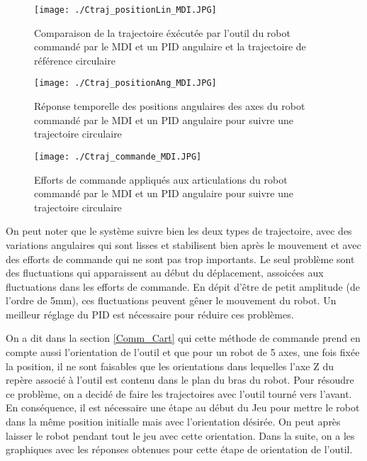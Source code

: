 \begin{figure}[H]
	\begin{center}	
		\captionsetup{justification=centering,margin=1cm}
		\texttt{[image: ./Ctraj\_positionLin\_MDI.JPG]}
		\caption{Comparaison de la trajectoire éxécutée par l'outil du robot commandé par le MDI et un PID angulaire et la trajectoire de référence circulaire}
		\label{fig:Ctraj_positionLin_MDI}
	\end{center}
\end{figure}
\newpage
\begin{figure}[H]
	\begin{center}	
		\captionsetup{justification=centering,margin=1cm}
		\texttt{[image: ./Ctraj\_positionAng\_MDI.JPG]}
		\caption{Réponse temporelle des positions angulaires des axes du robot commandé par le MDI et un PID angulaire pour suivre une trajectoire circulaire}
		\label{fig:Ctraj_positionAng_MDI}
	\end{center}
\end{figure}

\begin{figure}[H]
	\begin{center}	
		\captionsetup{justification=centering,margin=1cm}
		\texttt{[image: ./Ctraj\_commande\_MDI.JPG]}
		\caption{Efforts de commande appliqués aux articulations du robot commandé par le MDI et un PID angulaire pour suivre une trajectoire circulaire}
		\label{fig:Ctraj_commande_MDI}
	\end{center}
\end{figure}

On peut noter que le système suivre bien les deux types de trajectoire, avec des variations angulaires qui sont lisses et stabilisent bien après le mouvement et avec des efforts de commande qui ne sont pas trop importants. Le seul problème sont des fluctuations qui apparaissent au début du déplacement, assoicées aux fluctuations dans les efforts de commande. En dépit d'être de petit amplitude (de l'ordre de 5mm), ces fluctuations peuvent gêner le mouvement du robot. Un meilleur réglage du PID est nécessaire pour réduire ces problèmes. 

On a dit dans la section \ref{Comm_Cart} qui cette méthode de commande prend en compte aussi l'orientation de l'outil et que pour un robot de 5 axes, une fois fixée la position, il ne sont faisables que les orientations dans lequelles l'axe Z du repère associé à l'outil est contenu dans le plan du bras du robot. Pour résoudre ce problème, on a decidé de faire les trajectoires avec l'outil tourné vers l'avant. En conséquence, il est nécessaire une étape au début du Jeu pour mettre le robot dans la même position initialle mais avec l'orientation désirée. On peut après laisser le robot pendant tout le jeu avec cette orientation. Dans la suite, on a les graphiques avec les réponses obtenues pour cette étape de orientation de l'outil.

